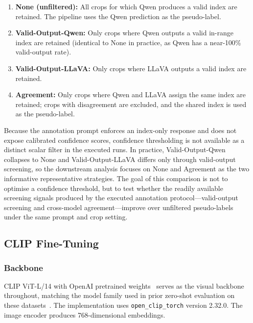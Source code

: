 \documentclass{ieeeaccess}
\begin{document}
\begin{enumerate}
    \item \textbf{None (unfiltered):} All crops for which Qwen
    produces a valid index are retained.
    The pipeline uses the Qwen prediction as the pseudo-label.

    \item \textbf{Valid-Output-Qwen:} Only crops where Qwen outputs
    a valid in-range index are retained (identical to None in
    practice, as Qwen has a near-100\% valid-output rate).

    \item \textbf{Valid-Output-LLaVA:} Only crops where LLaVA outputs
    a valid index are retained.

    \item \textbf{Agreement:} Only crops where Qwen and LLaVA assign
    the same index are retained; crops with disagreement are excluded,
    and the shared index is used as the pseudo-label.
\end{enumerate}

Because the annotation prompt enforces an index-only response and does
not expose calibrated confidence scores, confidence thresholding is not
available as a distinct scalar filter in the executed runs.
In practice, Valid-Output-Qwen collapses to None and Valid-Output-LLaVA
differs only through valid-output screening, so the
downstream analysis focuses on None and Agreement as the two
informative representative strategies.
The goal of this comparison is not to optimise a confidence
threshold, but to test whether the readily available screening signals
produced by the executed annotation protocol---valid-output screening
and cross-model agreement---improve over unfiltered pseudo-labels under
the same prompt and crop setting.

\subsection{CLIP Fine-Tuning}
\label{sec:finetune}

\subsubsection{Backbone}

CLIP ViT-L/14 with OpenAI pretrained
weights~\cite{radford2021learning} serves as the visual backbone
throughout,
matching the model family used in prior zero-shot evaluation on these
datasets~\cite{scb_dataset}.
The implementation uses \texttt{open\_clip\_torch} version 2.32.0.
The image encoder produces 768-dimensional embeddings.
\end{document}

